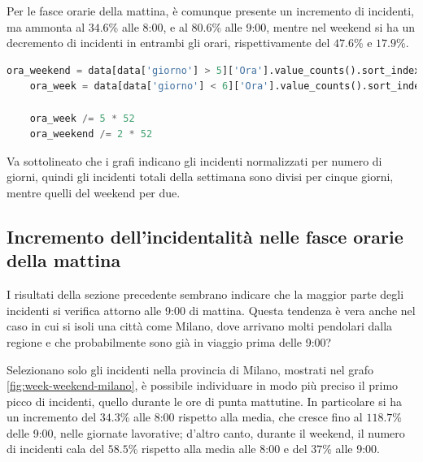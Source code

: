 \documentclass[a4paper]{report}
\begin{document}
Per le fasce orarie della mattina, è comunque presente un incremento di incidenti, ma 
ammonta al $34.6$\% alle 8:00, e al $80.6$\% alle 9:00, mentre nel weekend si ha un 
decremento di incidenti in entrambi gli orari, rispettivamente del $47.6$\% e $17.9$\%.

\begin{lstlisting}[language=Python]
    ora_weekend = data[data['giorno'] > 5]['Ora'].value_counts().sort_index()
    ora_week = data[data['giorno'] < 6]['Ora'].value_counts().sort_index()

    ora_week /= 5 * 52
    ora_weekend /= 2 * 52
\end{lstlisting}

Va sottolineato che i grafi indicano gli incidenti normalizzati per numero di 
giorni, quindi gli incidenti totali della settimana sono divisi per cinque giorni, 
mentre quelli del weekend per due.

\subsection{Incremento dell'incidentalità nelle fasce orarie della mattina}

I risultati della sezione precedente sembrano indicare che la maggior parte degli incidenti 
si verifica attorno alle 9:00 di mattina. Questa tendenza è vera anche nel caso in cui si 
isoli una città come Milano, dove arrivano molti pendolari dalla regione e che probabilmente sono 
già in viaggio prima delle 9:00?

Selezionano solo gli incidenti nella provincia di Milano, mostrati nel grafo 
\ref{fig:week-weekend-milano}, è possibile individuare in modo più preciso
il primo picco di incidenti, quello durante le ore di punta mattutine.
In particolare si ha un incremento del $34.3$\% alle 8:00 rispetto alla media, 
che cresce fino al $118.7$\% delle 9:00, nelle giornate lavorative;
d'altro canto, durante il weekend, il numero di incidenti cala del $58.5$\% rispetto alla media alle 8:00 
e del $37$\% alle 9:00.
\end{document}
